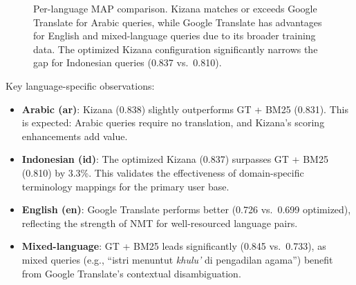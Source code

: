 \documentclass[preprint,12pt,numbers]{elsarticle}
\begin{document}
\begin{figure}[t]
\centering
{}
\caption{Per-language MAP comparison. Kizana matches or exceeds Google Translate for Arabic queries, while Google Translate has advantages for English and mixed-language queries due to its broader training data. The optimized Kizana configuration significantly narrows the gap for Indonesian queries (0.837 vs.\ 0.810).}
\label{fig:per-lang-comparison}
\end{figure}

Key language-specific observations:

\begin{itemize}
    \item \textbf{Arabic (ar)}: Kizana (0.838) slightly outperforms GT + BM25 (0.831). This is expected: Arabic queries require no translation, and Kizana's scoring enhancements add value.

    \item \textbf{Indonesian (id)}: The optimized Kizana (0.837) surpasses GT + BM25 (0.810) by 3.3\%. This validates the effectiveness of domain-specific terminology mappings for the primary user base.

    \item \textbf{English (en)}: Google Translate performs better (0.726 vs.\ 0.699 optimized), reflecting the strength of NMT for well-resourced language pairs.

    \item \textbf{Mixed-language}: GT + BM25 leads significantly (0.845 vs.\ 0.733), as mixed queries (e.g., ``istri menuntut \textit{khulu'} di pengadilan agama'') benefit from Google Translate's contextual disambiguation.
\end{itemize}
\end{document}
